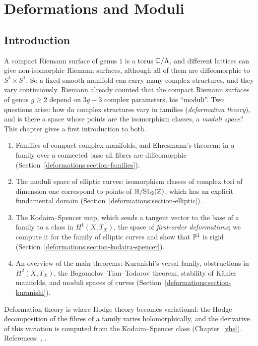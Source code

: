 \chapter{Deformations and Moduli}\label{deformations}

\section{Introduction}\label{deformations:section-introduction}

A compact Riemann surface of genus $1$ is a torus $\mathbb{C}/\Lambda$, and different lattices can give non-isomorphic Riemann surfaces, although all of them are diffeomorphic to $S^1 \times S^1$. So a fixed
smooth manifold can carry many complex structures, and they vary continuously. Riemann already counted that the compact Riemann surfaces of genus $g \geq 2$ depend on $3g - 3$ complex parameters, his
``moduli''. Two questions arise: how do complex structures vary in families (\emph{deformation theory}), and is there a space whose points are the isomorphism classes, a \emph{moduli space}? This chapter
gives a first introduction to both.
\begin{enumerate}
\item Families of compact complex manifolds, and Ehresmann's theorem: in a family over a connected base all fibres are diffeomorphic
(Section~\ref{deformations:section-families}).
\item The moduli space of elliptic curves: isomorphism classes of complex tori of dimension one correspond to points of $\mathbb{H}/\mathrm{SL}_2(\mathbb{Z})$, which has an explicit fundamental domain
(Section~\ref{deformations:section-elliptic}).
\item The Kodaira--Spencer map, which sends a tangent vector to the base of a family to a class in $H^1(X, T_X)$, the space of \emph{first-order deformations}; we compute it for the family of elliptic curves and
show that $\mathbb{P}^1$ is rigid (Section~\ref{deformations:section-kodaira-spencer}).
\item An overview of the main theorems: Kuranishi's versal family, obstructions in $H^2(X, T_X)$, the Bogomolov--Tian--Todorov theorem, stability of K\"ahler manifolds, and moduli spaces of curves
(Section~\ref{deformations:section-kuranishi}).
\end{enumerate}
Deformation theory is where Hodge theory becomes variational: the Hodge decomposition of the fibres of a family varies holomorphically, and the derivative of this variation is computed from the
Kodaira--Spencer class (Chapter~\ref{vhs}). References: \cite[Chapter 6]{huybrechts-complex}, \cite[Chapter 9]{voisin-hodge-1}.

